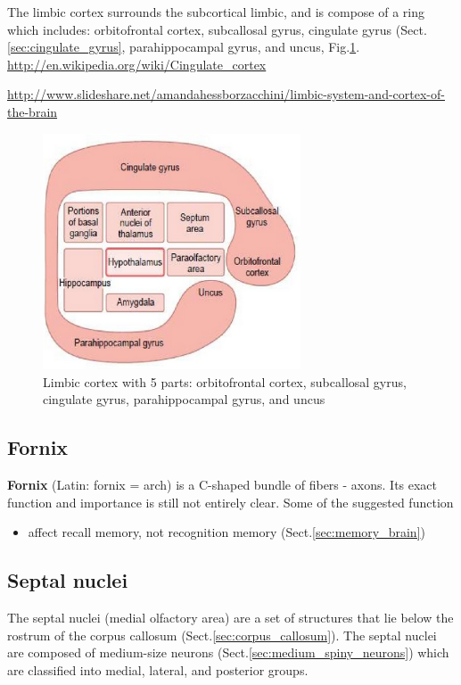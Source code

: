 The limbic cortex surrounds the subcortical limbic, 
and is compose of a ring which includes: orbitofrontal cortex, subcallosal
gyrus, cingulate gyrus (Sect.\ref{sec:cingulate_gyrus}, parahippocampal gyrus,
and uncus, Fig.\ref{fig:limbic_cortex}.
\url{http://en.wikipedia.org/wiki/Cingulate_cortex}

\url{http://www.slideshare.net/amandahessborzacchini/limbic-system-and-cortex-of-the-brain}


\begin{figure}[hbt]
  \centerline{\includegraphics[height=7cm,
    angle=0]{./images/limbic_cortex.eps}}
\caption{Limbic cortex with 5 parts: orbitofrontal cortex, subcallosal
gyrus, cingulate gyrus, parahippocampal gyrus, and uncus}
\label{fig:limbic_cortex}
\end{figure}

\subsection{Fornix}
\label{sec:Fornix}

{\bf Fornix} (Latin: fornix = arch) is a C-shaped bundle of fibers - axons.
Its exact function and importance is still not entirely clear. Some of the
suggested function
\begin{itemize}
  \item affect recall memory, not recognition memory
  (Sect.\ref{sec:memory_brain})
\end{itemize}


\subsection{Septal nuclei}
\label{sec:septal_nuclei}

The septal nuclei (medial olfactory area) are a set of structures that lie below
the rostrum of the corpus callosum (Sect.\ref{sec:corpus_callosum}).
The septal nuclei are composed of medium-size neurons
(Sect.\ref{sec:medium_spiny_neurons}) which are classified into medial, lateral,
and posterior groups.

